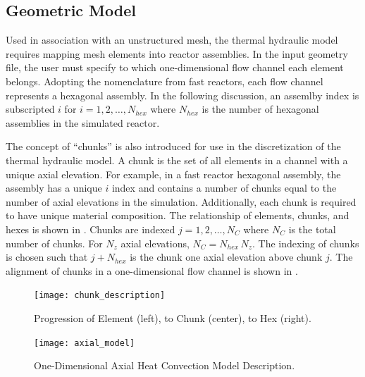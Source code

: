   \subsection{Geometric Model}
    Used in association with an unstructured mesh, the thermal hydraulic model
    requires mapping mesh elements into reactor assemblies. In the input
    geometry file, the user must specify to which one-dimensional flow channel 
    each element belongs.
    Adopting the nomenclature from fast reactors, each flow channel represents a
    hexagonal assembly. In the following discussion, an assemlby index is
    subscripted $i$ for $i = 1,2,\ldots,N_{hex}$ where $N_{hex}$ is the number
    of hexagonal assemblies in the simulated reactor. 

    The concept of ``chunks'' is also introduced for use in the discretization 
    of the thermal hydraulic model. A chunk is the set of all elements in a 
    channel with a unique axial elevation. For example, in a fast reactor 
    hexagonal assembly, the assembly has a unique $i$ index and contains a 
    number of chunks equal to the number of axial elevations in the simulation. 
    Additionally, each chunk is required to have unique material composition. 
    The relationship of elements, chunks, and hexes is shown in 
    . Chunks are indexed $j = 1,2,\ldots,N_C$ where
    $N_C$ is the total number of chunks.  For $N_z$ axial elevations, 
    $N_C = N_{hex} \, N_z$. The indexing of chunks is chosen such that 
    $j+N_{hex}$ is the chunk one axial elevation above chunk $j$. The alignment
    of chunks in a one-dimensional flow channel is shown in
    .

    \begin{figure}
      \centering
      \texttt{[image: chunk\_description]}
      \caption{Progression of Element (left), to Chunk (center), to Hex 
        (right).}
      \label{fig:chunk_description}
    \end{figure}
    
    \begin{figure}
      \centering
      \texttt{[image: axial\_model]}
      \caption{One-Dimensional Axial Heat Convection Model Description.}
      \label{fig:axial_model}
    \end{figure}

